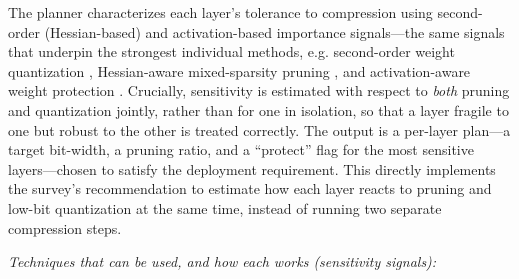 The planner characterizes each layer's tolerance to compression using second-order (Hessian-based) and activation-based importance signals---the same signals that underpin the strongest individual methods, e.g. second-order weight quantization \cite{frantar2023gptq}, Hessian-aware mixed-sparsity pruning \cite{shao2024sensitivity}, and activation-aware weight protection \cite{lin2024awq}. Crucially, sensitivity is estimated with respect to \emph{both} pruning and quantization jointly, rather than for one in isolation, so that a layer fragile to one but robust to the other is treated correctly. The output is a per-layer plan---a target bit-width, a pruning ratio, and a ``protect'' flag for the most sensitive layers---chosen to satisfy the deployment requirement. This directly implements the survey's recommendation to estimate how each layer reacts to pruning and low-bit quantization at the same time, instead of running two separate compression steps.

\emph{Techniques that can be used, and how each works (sensitivity signals):}

